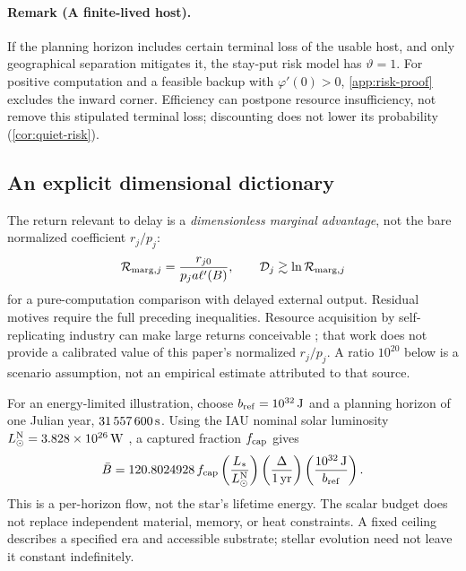 \documentclass[11pt,a4paper]{article}
\theoremstyle{definition}\newtheorem{definition}{Definition}
\begin{document}
\paragraph{Remark (A finite-lived host).}
If the planning horizon includes certain terminal loss of the usable host,
and only geographical separation mitigates it, the stay-put risk model has
$\vartheta=1$. For positive computation and a feasible backup with
$\varphi'(0)>0$, \cref{app:risk-proof} excludes the inward corner.
Efficiency can postpone resource insufficiency, not remove this stipulated
terminal loss; discounting does not lower its probability
(\cref{cor:quiet-risk}).

\subsection{An explicit dimensional dictionary}
The return relevant to delay is a \emph{dimensionless marginal advantage},
not the bare normalized coefficient $r_j/p_j$:
\begin{equation}
 \mathcal R_{{\rm marg},j}
   =\frac{r_{j0}}{p_j a\ell'(B)},\qquad
 \mathcal D_j\gtrsim\ln\mathcal R_{{\rm marg},j}
 \label{eq:physical-return-ratio}
\end{equation}
for a pure-computation comparison with delayed external output. Residual
motives require the full preceding inequalities. Resource acquisition by
self-replicating industry can make large returns conceivable
\citep{ArmstrongSandberg2013}; that work does not provide a calibrated
value of this paper's normalized $r_j/p_j$. A ratio $10^{20}$ below is a
scenario assumption, not an empirical estimate attributed to that source.

For an energy-limited illustration, choose $b_{\rm ref}=10^{32}\,{\rm J}$
and a planning horizon of one Julian year, $31\,557\,600\,{\rm s}$.
Using the IAU nominal solar luminosity
$L_\odot^{\rm N}=3.828\times10^{26}\,{\rm W}$ \citep{IAU2015}, a captured
fraction $f_{\rm cap}$ gives
\begin{equation}
 \bar B=120.8024928\,f_{\rm cap}
 \left(\frac{L_*}{L_\odot^{\rm N}}\right)
 \left(\frac{\Delta}{1\,{\rm yr}}\right)
 \left(\frac{10^{32}\,{\rm J}}{b_{\rm ref}}\right).
 \label{eq:stellar-budget}
\end{equation}
This is a per-horizon flow, not the star's lifetime energy. The scalar
budget does not replace independent material, memory, or heat constraints.
A fixed ceiling describes a specified era and accessible substrate;
stellar evolution need not leave it constant indefinitely.
\end{document}
